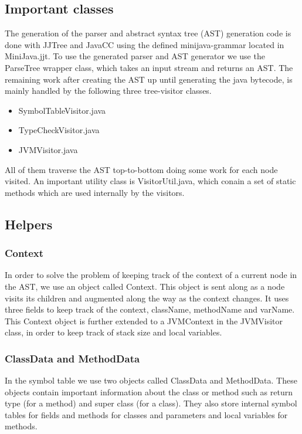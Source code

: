 \documentclass[paper=a4, fontsize=11pt]{scrartcl} %
\numberwithin{equation}{section} %
\numberwithin{figure}{section} %
\numberwithin{table}{section} %
\begin{document}
\subsection*{Important classes}
The generation of the parser and abstract syntax tree (AST) generation code is done with JJTree and JavaCC using the defined minijava-grammar located in MiniJava.jjt. To use the generated parser and AST generator we use the ParseTree wrapper class, which takes an input stream and returns an AST. The remaining work after creating the AST up until generating the java bytecode, is mainly handled by the following three tree-visitor classes.
\begin{itemize}
  \item{SymbolTableVisitor.java}
  \item{TypeCheckVisitor.java}
  \item{JVMVisitor.java}
\end{itemize}
All of them traverse the AST top-to-bottom doing some work for each node visited. An important utility class is VisitorUtil.java, which conain a set of static methods which are used internally by the visitors.
\subsection*{Helpers}
\subsubsection*{Context}
In order to solve the problem of keeping track of the context of a current node in the AST, we use an object called Context. This object is sent along as a node visits its children and augmented along the way as the context changes. It uses three fields to keep track of the context, className, methodName and varName. This Context object is further extended to a JVMContext in the JVMVisitor class, in order to keep track of stack size and local variables.
\subsubsection*{ClassData and MethodData}
In the symbol table we use two objects called ClassData and MethodData. These objects contain important information about the class or method such as return type (for a method) and super class (for a class). They also store internal symbol tables for fields and methods for classes and parameters and local variables for methods.
\end{document}
